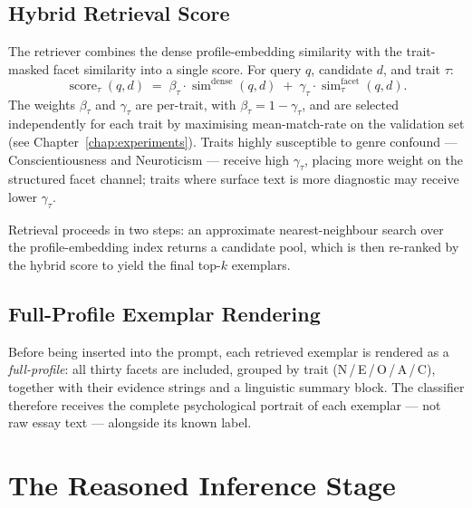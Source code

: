 \documentclass[../main.tex]{subfiles}
\begin{document}
\subsection{Hybrid Retrieval Score}
\label{subsec:hybrid-score}

The retriever combines the dense profile-embedding similarity with the
trait-masked facet similarity into a single score. For query $q$, candidate
$d$, and trait $\tau$:
%
\begin{equation}
  \label{eq:hybrid}
  \operatorname{score}_\tau(q, d)
  \;=\;
  \beta_\tau \cdot \operatorname{sim}^{\mathrm{dense}}(q, d)
  \;+\;
  \gamma_\tau \cdot \operatorname{sim}^{\mathrm{facet}}_{\tau}(q, d).
\end{equation}
%
The weights $\beta_\tau$ and $\gamma_\tau$ are per-trait, with $\beta_\tau = 1 - \gamma_\tau$,
and are selected independently for each trait by maximising mean-match-rate on the
validation set (see Chapter~\ref{chap:experiments}). Traits highly susceptible to
genre confound --- Conscientiousness and Neuroticism --- receive high $\gamma_\tau$,
placing more weight on the structured facet channel; traits where surface text
is more diagnostic may receive lower $\gamma_\tau$.

Retrieval proceeds in two steps: an approximate nearest-neighbour search over
the profile-embedding index returns a candidate pool, which is then re-ranked
by the hybrid score to yield the final top-$k$ exemplars.

\subsection{Full-Profile Exemplar Rendering}
\label{subsec:exemplar-rendering}

Before being inserted into the prompt, each retrieved exemplar is rendered as
a \emph{full-profile}: all thirty facets are included, grouped by trait
(N\,/\,E\,/\,O\,/\,A\,/\,C), together with their evidence strings and a
linguistic summary block. The classifier therefore receives the complete
psychological portrait of each exemplar --- not raw essay text ---
alongside its known label.


\section{The Reasoned Inference Stage}
\label{sec:prompt}
\end{document}
